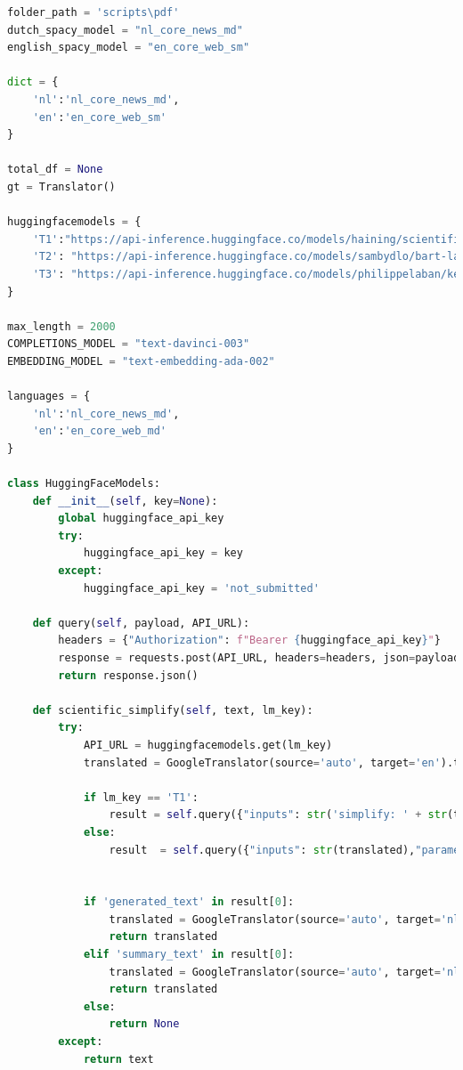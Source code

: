 \begin{center}
	\begin{lstlisting}[language=Python, caption={Script voor de derde fase van de vergelijkende studie}, label={code:verg-studie-phase-3}]		
folder_path = 'scripts\pdf'
dutch_spacy_model = "nl_core_news_md"
english_spacy_model = "en_core_web_sm"
	
dict = {
	'nl':'nl_core_news_md',
	'en':'en_core_web_sm'
}
		
total_df = None
gt = Translator()
		
huggingfacemodels = {
	'T1':"https://api-inference.huggingface.co/models/haining/scientific_abstract_simplification",
	'T2': "https://api-inference.huggingface.co/models/sambydlo/bart-large-scientific-lay-summarisation",
	'T3': "https://api-inference.huggingface.co/models/philippelaban/keep_it_simple"
}
		
max_length = 2000
COMPLETIONS_MODEL = "text-davinci-003"
EMBEDDING_MODEL = "text-embedding-ada-002"
	
languages = {
	'nl':'nl_core_news_md',
	'en':'en_core_web_md'
}
		
class HuggingFaceModels:
	def __init__(self, key=None):
		global huggingface_api_key
		try:
			huggingface_api_key = key
		except:
			huggingface_api_key = 'not_submitted'
				
	def query(self, payload, API_URL):
		headers = {"Authorization": f"Bearer {huggingface_api_key}"}
		response = requests.post(API_URL, headers=headers, json=payload)
		return response.json()
			
	def scientific_simplify(self, text, lm_key):
		try:
			API_URL = huggingfacemodels.get(lm_key)
			translated = GoogleTranslator(source='auto', target='en').translate(str(text))
			
			if lm_key == 'T1':
				result = self.query({"inputs": str('simplify: ' + str(translated)),"parameters": {"max_length": len(sentence)+10},"options":{"wait_for_model":True}}, API_URL)
			else:
				result  = self.query({"inputs": str(translated),"parameters": {"max_length": len(sentence)+10},"options":{"wait_for_model":True}}, API_URL)
					
					
			if 'generated_text' in result[0]:
				translated = GoogleTranslator(source='auto', target='nl').translate(str(result[0]['generated_text']))
				return translated
			elif 'summary_text' in result[0]:
				translated = GoogleTranslator(source='auto', target='nl').translate(str(result[0]['summary_text']))
				return translated
			else:
				return None
		except:
			return text
		

\end{lstlisting}
\end{center}

